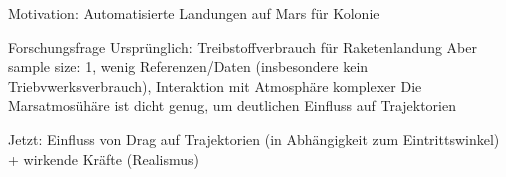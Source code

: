 
Motivation: Automatisierte Landungen auf Mars für Kolonie

Forschungsfrage
Ursprünglich: Treibstoffverbrauch für Raketenlandung
Aber sample size: 1, wenig Referenzen/Daten (insbesondere kein Triebvwerksverbrauch), Interaktion mit Atmosphäre komplexer
Die Marsatmosühäre ist dicht genug, um deutlichen Einfluss auf Trajektorien

Jetzt:
Einfluss von Drag auf Trajektorien (in Abhängigkeit zum Eintrittswinkel)
+ wirkende Kräfte (Realismus)